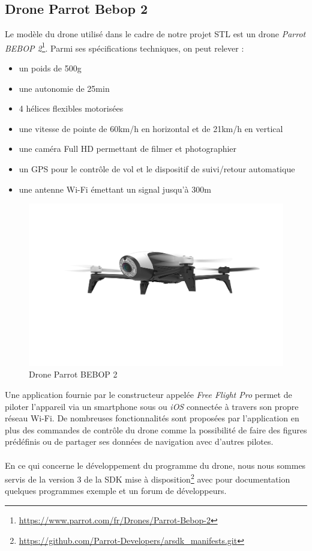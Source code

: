\subsection{Drone Parrot Bebop 2}

Le modèle du drone utilisé dans le cadre de notre projet STL est un drone \textit{Parrot BEBOP 2}\footnote{\url{https://www.parrot.com/fr/Drones/Parrot-Bebop-2}}. Parmi ses spécifications techniques, on peut relever :
\begin{itemize}
\item un poids de 500g
\item une autonomie de 25min
\item 4 hélices flexibles motorisées
\item une vitesse de pointe de 60km/h en horizontal et de 21km/h en vertical
\item une caméra Full HD permettant de filmer et photographier
\item un GPS pour le contrôle de vol et le dispositif de suivi/retour automatique
\item une antenne  Wi-Fi émettant un signal jusqu'à 300m
\end{itemize}

\newpage
\begin{figure}
\begin{center}
\includegraphics[scale=0.05]{images/drone.jpg}
\caption{Drone Parrot BEBOP 2}
\end{center}
\end{figure}

Une application fournie par le constructeur appelée \textit{Free Flight Pro} permet de piloter l'appareil via un smartphone sous \android{} ou \textit{iOS} connectée à travers son propre réseau Wi-Fi. De nombreuses fonctionnalités sont proposées par l'application en plus des commandes de contrôle du drone comme la possibilité de faire des figures prédéfinis ou de partager ses données de navigation avec d'autres pilotes.

\paragraph{}
En ce qui concerne le développement du programme du drone, nous nous sommes servis de la version 3 de la SDK mise à disposition\footnote{\url{https://github.com/Parrot-Developers/arsdk_manifests.git}} avec pour documentation quelques programmes exemple et un forum de développeurs.